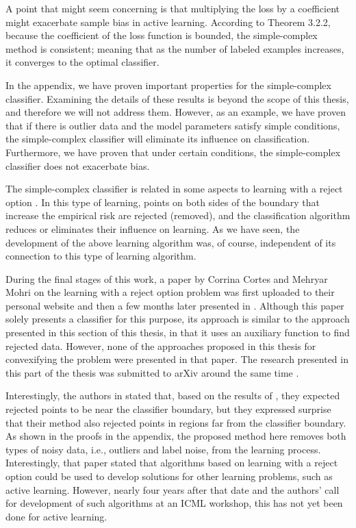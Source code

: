 \documentclass[12pt]{article}
\begin{document}
	A point that might seem concerning is that multiplying the loss by a coefficient might exacerbate sample bias in active learning. According to Theorem 3.2.2, because the coefficient of the loss function is bounded, the simple-complex method is consistent; meaning that as the number of labeled examples increases, it converges to the optimal classifier.
	
	In the appendix, we have proven important properties for the simple-complex classifier. Examining the details of these results is beyond the scope of this thesis, and therefore we will not address them. However, as an example, we have proven that if there is outlier data and the model parameters satisfy simple conditions, the simple-complex classifier will eliminate its influence on classification. Furthermore, we have proven that under certain conditions, the simple-complex classifier does not exacerbate bias.
	
	The simple-complex classifier is related in some aspects to learning with a reject option \cite{herbster1998learning}. In this type of learning, points on both sides of the boundary that increase the empirical risk are rejected (removed), and the classification algorithm reduces or eliminates their influence on learning. As we have seen, the development of the above learning algorithm was, of course, independent of its connection to this type of learning algorithm.
	
	During the final stages of this work, a paper by Corrina Cortes and Mehryar Mohri on the learning with a reject option problem was first uploaded to their personal website and then a few months later presented in \cite{cortes2016learning}. Although this paper solely presents a classifier for this purpose, its approach is similar to the approach presented in this section of this thesis, in that it uses an auxiliary function to find rejected data. However, none of the approaches proposed in this thesis for convexifying the problem were presented in that paper. The research presented in this part of the thesis was submitted to arXiv around the same time \cite{karimi2016statistical}.
	
	Interestingly, the authors in \cite{cortes2016learning} stated that, based on the results of \cite{herbster1998learning}, they expected rejected points to be near the classifier boundary, but they expressed surprise that their method also rejected points in regions far from the classifier boundary. As shown in the proofs in the appendix, the proposed method here removes both types of noisy data, i.e., outliers and label noise, from the learning process. Interestingly, that paper stated that algorithms based on learning with a reject option could be used to develop solutions for other learning problems, such as active learning. However, nearly four years after that date and the authors' call for development of such algorithms at an ICML workshop, this has not yet been done for active learning.
	
\end{document}
